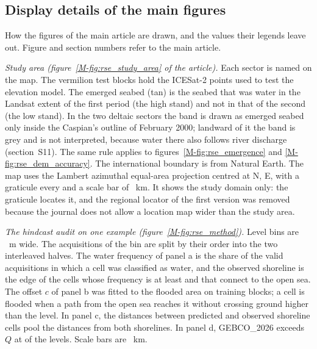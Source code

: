 
\subsection*{Display details of the main figures}
How the figures of the main article are drawn, and the values their legends leave out. Figure and section numbers refer to the main article.

\emph{Study area (figure~\ref{M-fig:rse_study_area} of the article).} Each sector is named on the map. The vermilion test blocks hold the ICESat-2 points used to test the elevation model. The emerged seabed (tan) is the seabed that was water in the Landsat extent of the first period (the  high stand) and not in that of the second (the  low stand). In the two deltaic sectors the band is drawn as emerged seabed only inside the Caspian's outline of February 2000; landward of it the band is grey and is not interpreted, because water there also follows river discharge (section~S11). The same rule applies to figures~\ref{M-fig:rse_emergence} and \ref{M-fig:rse_dem_accuracy}. The international boundary is from Natural Earth. The map uses the Lambert azimuthal equal-area projection centred at \textdegree{}N, \textdegree{}E, with a graticule every \textdegree{} and a scale bar of ~km. It shows the study domain only: the graticule locates it, and the regional locator of the first version was removed because the journal does not allow a location map wider than the study area.

\emph{The hindcast audit on one example (figure~\ref{M-fig:rse_method}).} Level bins are ~m wide. The acquisitions of the bin are split by their order into the two interleaved halves. The water frequency of panel a is the share of the valid acquisitions in which a cell was classified as water, and the observed shoreline is the edge of the cells whose frequency is at least  and that connect to the open sea. The offset $c$ of panel b was fitted to the flooded area on training blocks; a cell is flooded when a path from the open sea reaches it without crossing ground higher than the level. In panel c, the distances between predicted and observed shoreline cells pool the distances from both shorelines. In panel d, GEBCO\_2026 exceeds $Q$ at  of the  levels. Scale bars are ~km.

